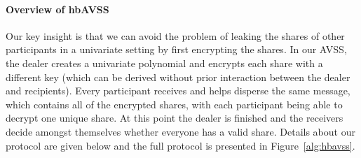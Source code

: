 \documentclass{sig-alternate-05-2015}
\begin{document}
\paragraph{Overview of hbAVSS}

Our key insight is that we can avoid the problem of leaking the shares of other participants in a univariate setting by first encrypting the shares. In our AVSS, the dealer creates a univariate polynomial and encrypts each share with a different key (which can be derived without prior interaction between the dealer and recipients). Every participant receives and helps disperse the same message, which contains all of the encrypted shares, with each participant being able to decrypt one unique share. At this point the dealer is finished and the receivers decide amongst themselves whether everyone has a valid share. Details about our protocol are given below and the full protocol is presented in Figure~\ref{alg:hbavss}.

\end{document}
